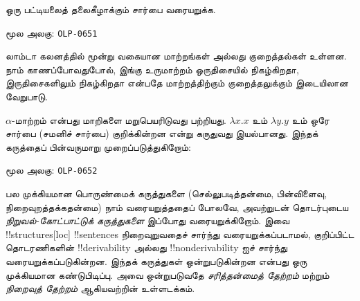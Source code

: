 \documentclass[11pt,a4paper,openany]{memoir}
\begin{document}
\begin{prob}
  ஒரு பட்டியலைத் தலைகீழாக்கும் சார்பை வரையறுக்க.
\end{prob}


\clearpage
\noindent மூல அலகு: \texttt{OLP-0651}\par





லாம்டா கலனத்தில் மூன்று வகையான மாற்றங்கள் அல்லது குறைத்தல்கள் உள்ளன.
நாம் காணப்போவதுபோல், இங்கு உருமாற்றம் ஒருதிசையில் நிகழ்கிறதா,
இருதிசைகளிலும் நிகழ்கிறதா என்பதே மாற்றத்திற்கும் குறைத்தலுக்கும்
இடையிலான வேறுபாடு.

$\alpha$-மாற்றம் என்பது மாறிகளை மறுபெயரிடுவது பற்றியது.
$\lambda x. x$ உம் $\lambda y.y$ உம் ஒரே சார்பை
(சமனிச் சார்பை) குறிக்கின்றன என்று கருதுவது இயல்பானது.
இந்தக் கருத்தைப் பின்வருமாறு முறைப்படுத்துகிறோம்:



\clearpage
\noindent மூல அலகு: \texttt{OLP-0652}\par





\begin{explain}
பல முக்கியமான பொருண்மைக் கருத்துகளை (செல்லுபடித்தன்மை, பின்விளைவு,
நிறைவுறத்தக்கதன்மை) நாம் வரையறுத்ததைப் போலவே, அவற்றுடன் தொடர்புடைய
\emph{நிறுவல்-கோட்பாட்டுக் கருத்துகளை} இப்போது வரையறுக்கிறோம். இவை
!!{structure}s[loc] !!{sentence}s நிறைவுறுவதைச் சார்ந்து வரையறுக்கப்படாமல்,
குறிப்பிட்ட தொடரணிகளின் !!{derivability} அல்லது !!{nonderivability} ஐச்
சார்ந்து வரையறுக்கப்படுகின்றன. இந்தக் கருத்துகள் ஒன்றுபடுகின்றன என்பது ஒரு
முக்கியமான கண்டுபிடிப்பு. அவை ஒன்றுபடுவதே \emph{சரித்தன்மைத் தேற்றம்} மற்றும்
\emph{நிறைவுத் தேற்றம்} ஆகியவற்றின் உள்ளடக்கம்.
\end{explain}
\end{document}
